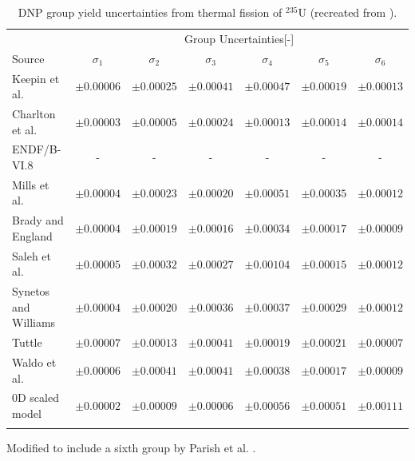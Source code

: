 \begin{table}[!h]
\centering
\begin{threeparttable}
\caption{\gls{DNP} group yield uncertainties from thermal fission of $^{235}$U (recreated from \cite{parish1999status}).}
\begin{tabular}{lcccccc}
\hline
 & \multicolumn{6}{c}{Group Uncertainties[-]} \\
Source & $\sigma_1$ & $\sigma_2$ & $\sigma_3$ & $\sigma_4$ & $\sigma_5$ & $\sigma_6$ \\
\hline
Keepin et al. \cite{keepin1957delayed}   & $\pm0.00006$ & $\pm0.00025$ & $\pm0.00041$ & $\pm0.00047$ & $\pm0.00019$ & $\pm0.00013$ \\
Charlton et al. \cite{charlton1996delayed}\tnote{*} & $\pm0.00003$ & $\pm0.00005$ & $\pm0.00024$ & $\pm0.00013$ & $\pm0.00014$ & $\pm0.00014$ \\
ENDF/B-VI.8 \cite{endf6}   & - & - & - & - & - & - \\
Mills et al. \cite{mills1991study}    & $\pm0.00004$ & $\pm0.00023$ & $\pm0.00020$ & $\pm0.00051$ & $\pm0.00035$ & $\pm0.00012$\\
Brady and England \cite{brady1989delayed} & $\pm0.00004$ & $\pm0.00019$ & $\pm0.00016$ & $\pm0.00034$ & $\pm0.00017$ & $\pm0.00009$ \\
Saleh et al. \cite{saleh1997measurements} & $\pm0.00005$ & $\pm0.00032$ & $\pm0.00027$ & $\pm0.00104$ & $\pm0.00015$ & $\pm0.00012$ \\
Synetos and Williams \cite{synetos1983delayed}\tnote{*} & $\pm0.00004$ & $\pm0.00020$ & $\pm0.00036$ & $\pm0.00037$ & $\pm0.00029$ & $\pm0.00012$ \\
Tuttle \cite{tuttle1975delayed}    & $\pm0.00007$ & $\pm0.00013$ & $\pm0.00041$ & $\pm0.00019$ & $\pm0.00021$ & $\pm0.00007$  \\
Waldo et al.\cite{waldo1981delayed}    & $\pm0.00006$ & $\pm0.00041$ & $\pm0.00041$ & $\pm0.00038$ & $\pm0.00017$ & $\pm0.00009$ \\
0D scaled model & $\pm0.00002$ & $\pm0.00009$ & $\pm0.00006$ & $\pm0.00056$ & $\pm0.00051$ & $\pm0.00111$\\

\hline
\label{tab:macro-yield-delta-net}
\end{tabular}
\begin{tablenotes}
\item[*] Modified to include a sixth group by Parish et al. \cite{parish1999status}.
\end{tablenotes}
\end{threeparttable}
\end{table}


